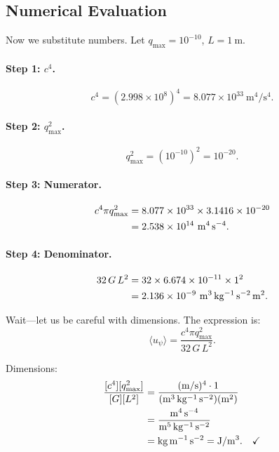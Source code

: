 \documentclass[aps,prd,twocolumn,showpacs,preprintnumbers,superscriptaddress,nofootinbib]{revtex4-2}
\begin{document}
\subsection{Numerical Evaluation}\label{sec:numerical}

Now we substitute numbers.  Let $q_{\max} = 10^{-10}$, $L = 1~\mathrm{m}$.

\paragraph{Step 1: $c^4$.}
\begin{equation}
c^4 = (2.998\times 10^8)^4 = 8.077\times 10^{33}~\mathrm{m^4/s^4}.
\end{equation}

\paragraph{Step 2: $q_{\max}^2$.}
\begin{equation}
q_{\max}^2 = (10^{-10})^2 = 10^{-20}.
\end{equation}

\paragraph{Step 3: Numerator.}
\begin{align}
c^4\pi q_{\max}^2 &= 8.077\times 10^{33}\times 3.1416\times 10^{-20} \notag\\
  &= 2.538\times 10^{14}~\mathrm{m^4\,s^{-4}}.
\end{align}

\paragraph{Step 4: Denominator.}
\begin{align}
32\,G\,L^2 &= 32\times 6.674\times 10^{-11}\times 1^2 \notag\\
  &= 2.136\times 10^{-9}~\mathrm{m^3\,kg^{-1}\,s^{-2}\,m^2}.
\end{align}

Wait---let us be careful with dimensions.  The expression is:
\begin{equation}
\langle u_\psi\rangle = \frac{c^4\pi q_{\max}^2}{32\,G\,L^2}.
\end{equation}

Dimensions:
\begin{align}
\frac{[c^4][q_{\max}^2]}{[G][L^2]}
  &= \frac{(\mathrm{m/s})^4 \cdot 1}{(\mathrm{m^3\,kg^{-1}\,s^{-2}})(\mathrm{m^2})} \notag\\
  &= \frac{\mathrm{m^4\,s^{-4}}}{\mathrm{m^5\,kg^{-1}\,s^{-2}}} \notag\\
  &= \mathrm{kg\,m^{-1}\,s^{-2}} = \mathrm{J/m^3}.\quad\checkmark
\end{align}
\end{document}
